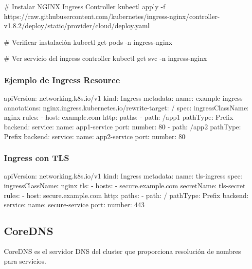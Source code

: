 \documentclass[11pt,a4paper]{article}
\begin{document}
\begin{commandbox}
\# Instalar NGINX Ingress Controller
kubectl apply -f \\
  https://raw.githubusercontent.com/kubernetes/ingress-nginx/controller-v1.8.2/deploy/static/provider/cloud/deploy.yaml

\# Verificar instalación
kubectl get pods -n ingress-nginx

\# Ver servicio del ingress controller
kubectl get svc -n ingress-nginx
\end{commandbox}

\subsubsection{Ejemplo de Ingress Resource}

\begin{commandbox}
apiVersion: networking.k8s.io/v1
kind: Ingress
metadata:
  name: example-ingress
  annotations:
    nginx.ingress.kubernetes.io/rewrite-target: /
spec:
  ingressClassName: nginx
  rules:
  - host: example.com
    http:
      paths:
      - path: /app1
        pathType: Prefix
        backend:
          service:
            name: app1-service
            port:
              number: 80
      - path: /app2
        pathType: Prefix
        backend:
          service:
            name: app2-service
            port:
              number: 80
\end{commandbox}

\subsubsection{Ingress con TLS}

\begin{commandbox}
apiVersion: networking.k8s.io/v1
kind: Ingress
metadata:
  name: tls-ingress
spec:
  ingressClassName: nginx
  tls:
  - hosts:
    - secure.example.com
    secretName: tls-secret
  rules:
  - host: secure.example.com
    http:
      paths:
      - path: /
        pathType: Prefix
        backend:
          service:
            name: secure-service
            port:
              number: 443
\end{commandbox}

\subsection{CoreDNS}

CoreDNS es el servidor DNS del cluster que proporciona resolución de nombres para servicios.
\end{document}
